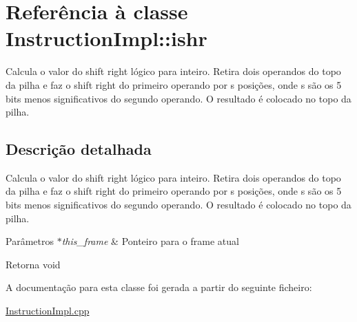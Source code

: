 \hypertarget{class_instruction_impl_1_1ishr}{}\section{Referência à classe Instruction\+Impl\+:\+:ishr}
\label{class_instruction_impl_1_1ishr}


Calcula o valor do shift right lógico para inteiro. Retira dois operandos do topo da pilha e faz o shift right do primeiro operando por s posições, onde s são os 5 bits menos significativos do segundo operando. O resultado é colocado no topo da pilha.  




\subsection{Descrição detalhada}
Calcula o valor do shift right lógico para inteiro. Retira dois operandos do topo da pilha e faz o shift right do primeiro operando por s posições, onde s são os 5 bits menos significativos do segundo operando. O resultado é colocado no topo da pilha. 


\begin{DoxyParams}{Parâmetros}
{\em $\ast$this\+\_\+frame} & Ponteiro para o frame atual \\
\hline
\end{DoxyParams}
\begin{DoxyReturn}{Retorna}
void 
\end{DoxyReturn}


A documentação para esta classe foi gerada a partir do seguinte ficheiro\+:\begin{DoxyCompactItemize}
\item 
\hyperlink{_instruction_impl_8cpp}{Instruction\+Impl.\+cpp}\end{DoxyCompactItemize}
